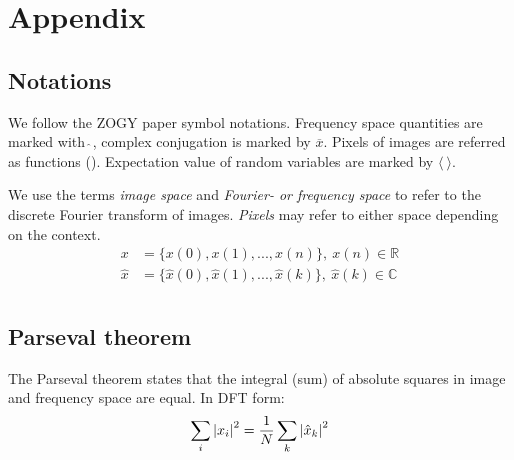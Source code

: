 \section{Appendix\label{sec:appendix}}
\subsection{Notations}
We follow the ZOGY paper symbol notations. Frequency space quantities are
marked with \(\hat{\ }\), complex conjugation is marked by
\(\overline{x}\). Pixels of images are referred as functions
(). Expectation value of random variables are marked by
\(\langle\ \rangle\).
%
\par We use the terms \emph{image space} and \emph{Fourier- or frequency
  space} to refer to the discrete Fourier transform of images. \emph{Pixels}
may refer to either space depending on the context.
\begin{align}
x &= \{x(0), x(1), ... , x(n) \},\ x(n) \in \mathbb{R}\\
\hat{x} &= \{\hat{x}(0), \hat{x}(1), ... , \hat{x}(k) \},\ \hat{x}(k) \in
\mathbb{C}\\
\label{eq:img_func}
\end{align}
%
\subsection{Parseval theorem\label{sec:parseval}}
The Parseval theorem states that the integral (sum) of absolute
squares in image and frequency space are equal. In DFT form:
\begin{equation}
  \sum_i \abs{x_i}^2 = \frac{1}{N} \sum_k \abs{\hat{x}_k}^2\label{eq:Parseval}
\end{equation}
%
